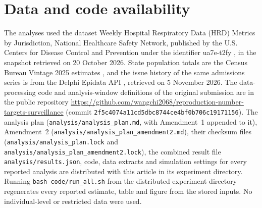 \section*{Data and code availability}
\label{sec:availability}

The analyses used the dataset Weekly Hospital Respiratory Data (HRD) Metrics by Jurisdiction, National Healthcare Safety Network, published by the U.S. Centers for Disease Control and Prevention under the identifier ua7e-t2fy \citep{cdc2026nhsn}, in the snapshot retrieved on 20 October 2026. State population totals are the Census Bureau Vintage 2025 estimates \citep{census2026popest}, and the issue history of the same admissions series is from the Delphi Epidata API \citep{reinhart2021open}, retrieved on 5 November 2026. The data-processing code and analysis-window definitions of the original submission are in the public repository \url{https://github.com/wangchi2068/reproduction-number-targets-surveillance} (commit \texttt{2f5c4074a11cd5dbc8744ce4\allowbreak bf0b706c19171156}). The analysis plan (\texttt{analysis/analysis\_plan.md}, with Amendment~1 appended to it), Amendment~2 (\texttt{analysis/analysis\_plan\_amendment2.md}), their checksum files (\texttt{analysis/analysis\_plan.lock} and \texttt{analysis/analysis\_plan\_amendment2.lock}), the combined result file \texttt{analysis/results.json}, code, data extracts and simulation settings for every reported analysis are distributed with this article in its experiment directory. Running \texttt{bash code/run\_all.sh} from the distributed experiment directory regenerates every reported estimate, table and figure from the stored inputs. No individual-level or restricted data were used.
